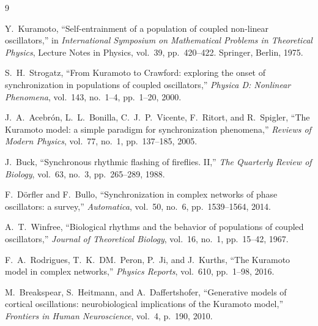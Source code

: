 \documentclass[11pt]{article}
\begin{document}
\begin{thebibliography}{9}

Y.~Kuramoto,
``Self-entrainment of a population of coupled non-linear oscillators,''
in \emph{International Symposium on Mathematical Problems in Theoretical Physics},
Lecture Notes in Physics, vol.~39, pp.~420--422.
Springer, Berlin, 1975.

S.~H.~Strogatz,
``From Kuramoto to Crawford: exploring the onset of synchronization in populations
of coupled oscillators,''
\emph{Physica D: Nonlinear Phenomena}, vol.~143, no.~1--4, pp.~1--20, 2000.

J.~A.~Acebrón, L.~L.~Bonilla, C.~J.~P.~Vicente, F.~Ritort, and R.~Spigler,
``The Kuramoto model: a simple paradigm for synchronization phenomena,''
\emph{Reviews of Modern Physics}, vol.~77, no.~1, pp.~137--185, 2005.

J.~Buck,
``Synchronous rhythmic flashing of fireflies. II,''
\emph{The Quarterly Review of Biology}, vol.~63, no.~3, pp.~265--289, 1988.

F.~D\"{o}rfler and F.~Bullo,
``Synchronization in complex networks of phase oscillators: a survey,''
\emph{Automatica}, vol.~50, no.~6, pp.~1539--1564, 2014.

A.~T.~Winfree,
``Biological rhythms and the behavior of populations of coupled oscillators,''
\emph{Journal of Theoretical Biology}, vol.~16, no.~1, pp.~15--42, 1967.

F.~A.~Rodrigues, T.~K.~DM.~Peron, P.~Ji, and J.~Kurths,
``The Kuramoto model in complex networks,''
\emph{Physics Reports}, vol.~610, pp.~1--98, 2016.

M.~Breakspear, S.~Heitmann, and A.~Daffertshofer,
``Generative models of cortical oscillations: neurobiological implications of the
Kuramoto model,''
\emph{Frontiers in Human Neuroscience}, vol.~4, p.~190, 2010.

\end{thebibliography}
\end{document}
